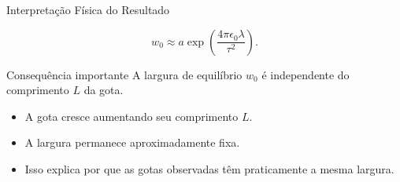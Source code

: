 \documentclass[aspectratio=169]{beamer}
\begin{document}
\begin{frame}{Interpretação Física do Resultado}

\begin{eqbox}
\begin{equation}
w_0
\approx
a\exp\left(
\frac{4\pi\epsilon_0\lambda}{\tau^2}
\right).
\tag{4.51}
\end{equation}
\end{eqbox}

\begin{mybox}{Consequência importante}
A largura de equilíbrio \(w_0\) é independente do comprimento \(L\) da gota.
\end{mybox}

\begin{itemize}
\item A gota cresce aumentando seu comprimento \(L\).
\item A largura permanece aproximadamente fixa.
\item Isso explica por que as gotas observadas têm praticamente a mesma largura.
\end{itemize}

\end{frame}


\end{document}
